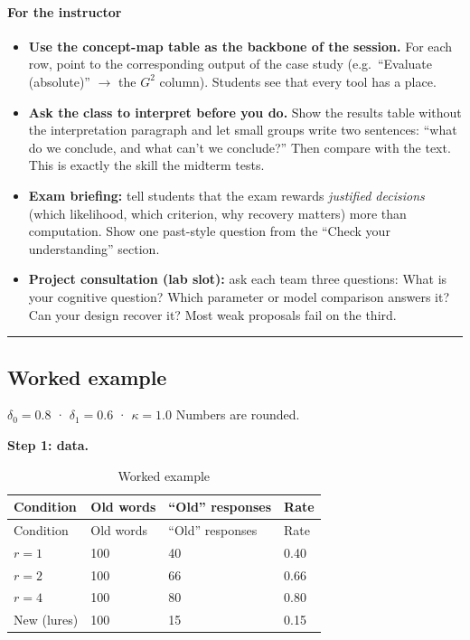 \paragraph{For the instructor}

\begin{itemize}
\tightlist
\item
  \textbf{Use the concept-map table as the backbone of the session.} For
  each row, point to the corresponding output of the case study
  (e.g.~``Evaluate (absolute)'' \ensuremath{\rightarrow} the \(G^2\) column). Students see that
  every tool has a place.
\item
  \textbf{Ask the class to interpret before you do.} Show the results
  table without the interpretation paragraph and let small groups write
  two sentences: ``what do we conclude, and what can't we conclude?''
  Then compare with the text. This is exactly the skill the midterm
  tests.
\item
  \textbf{Exam briefing:} tell students that the exam rewards
  \emph{justified decisions} (which likelihood, which criterion, why
  recovery matters) more than computation. Show one past-style question
  from the ``Check your understanding'' section.
\item
  \textbf{Project consultation (lab slot):} ask each team three
  questions: What is your cognitive question? Which parameter or model
  comparison answers it? Can your design recover it? Most weak proposals
  fail on the third.
\end{itemize}

\begin{center}\rule{0.5\linewidth}{0.5pt}\end{center}

\subsection{Worked example}

\(\delta_0 = 0.8\) · \(\delta_1 = 0.6\) · \(\kappa = 1.0\) Numbers are
rounded.

\textbf{Step 1: data.}

\begin{longtable}[]{@{}llll@{}}
\caption{\centering Worked example}\tabularnewline
\toprule\noalign{}
Condition & Old words & ``Old'' responses & Rate \\
\midrule\noalign{}
\endfirsthead
\toprule\noalign{}
Condition & Old words & ``Old'' responses & Rate \\
\midrule\noalign{}
\endhead
\bottomrule\noalign{}
\endlastfoot
\(r = 1\) & 100 & 40 & 0.40 \\
\(r = 2\) & 100 & 66 & 0.66 \\
\(r = 4\) & 100 & 80 & 0.80 \\
New (lures) & 100 & 15 & 0.15 \\
\end{longtable}


